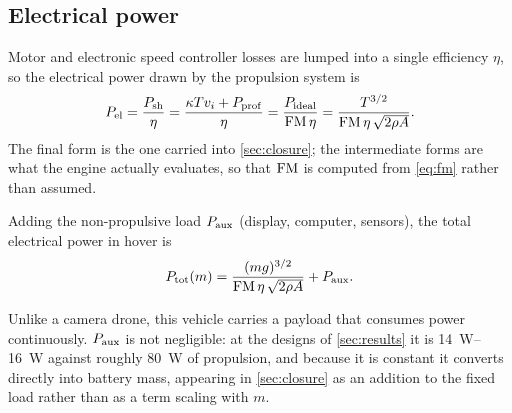 \subsection{Electrical power}

Motor and electronic speed controller losses are lumped into a single
efficiency $\eta$, so the electrical power drawn by the propulsion system is
\begin{equation}
  P_{\mathrm{el}} = \frac{P_{\mathrm{sh}}}{\eta}
         = \frac{\kappa Tv_i + P_{\mathrm{prof}}}{\eta}
         = \frac{P_{\mathrm{ideal}}}{\mathrm{FM}\,\eta}
         = \frac{T^{3/2}}{\mathrm{FM}\,\eta\,\sqrt{2\rho A}} .
  \label{eq:pelec}
\end{equation}
The final form is the one carried into \cref{sec:closure}; the intermediate
forms are what the engine actually evaluates, so that $\mathrm{FM}$ is computed from
\cref{eq:fm} rather than assumed.

Adding the non-propulsive load $P_{\mathrm{aux}}$ (display, computer, sensors), the total
electrical power in hover is
\begin{equation}
  P_{\mathrm{tot}}(m) = \frac{(mg)^{3/2}}{\mathrm{FM}\,\eta\,\sqrt{2\rho A}} + P_{\mathrm{aux}} .
  \label{eq:ptot}
\end{equation}

\begin{remark}
Unlike a camera drone, this vehicle carries a payload that consumes power
continuously. $P_{\mathrm{aux}}$ is not negligible: at the designs of \cref{sec:results}
it is \SIrange{14}{16}{\watt} against roughly \SI{80}{\watt} of propulsion, and
because it is constant it converts directly into battery mass, appearing in
\cref{sec:closure} as an addition to the fixed load rather than as a term
scaling with $m$.
\end{remark}

